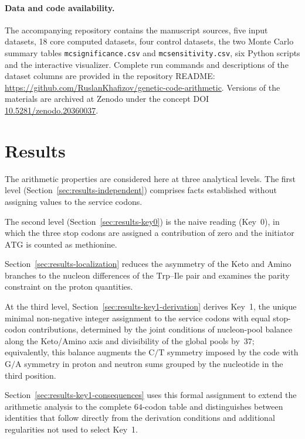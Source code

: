 \documentclass[11pt,a4paper]{article}
\renewcommand{\_}{\origunderscore\allowbreak}
\begin{document}
\paragraph{Data and code availability.}
The accompanying repository contains the manuscript sources, five
input datasets, 18 core computed datasets, four control datasets, the
two Monte Carlo summary tables \texttt{mc\_significance.csv} and
\texttt{mc\_sensitivity.csv}, six Python scripts and the interactive
visualizer. Complete run commands and
descriptions of the dataset columns are provided in the repository
README:
\url{https://github.com/RuslanKhafizov/genetic-code-arithmetic}.
Versions of the materials are archived at Zenodo under the concept
DOI
\href{https://doi.org/10.5281/zenodo.20360037}
     {10.5281/zenodo.20360037}.

\endgroup

\section{Results}
\label{sec:results}

The arithmetic properties are considered here at three analytical
levels. The first level (Section~\ref{sec:results-independent})
comprises facts established without assigning values to the service
codons.

The second level (Section~\ref{sec:results-key0}) is the naive reading
(Key~0), in which the three stop codons are assigned a contribution of
zero and the initiator $\mathrm{ATG}$ is counted as methionine.

Section~\ref{sec:results-localization} reduces the asymmetry of the
Keto and Amino branches to the nucleon differences of the
$\mathrm{Trp}$--$\mathrm{Ile}$ pair and examines the parity constraint
on the proton quantities.

At the third level, Section~\ref{sec:results-key1-derivation}
derives Key~1, the unique minimal non-negative integer assignment to
the service codons with equal stop-codon contributions, determined by
the joint conditions of nucleon-pool
balance along the Keto/Amino axis and divisibility of the global pools
by~$37$; equivalently, this balance augments the
$\mathrm{C}/\mathrm{T}$ symmetry imposed by the code with
$\mathrm{G}/\mathrm{A}$ symmetry in proton and neutron sums grouped by
the nucleotide in the third position.

Section~\ref{sec:results-key1-consequences} uses this formal assignment
to extend the arithmetic analysis to the complete $64$-codon table and
distinguishes between identities that follow directly from the
derivation conditions and additional regularities not used to select
Key~1.
\end{document}
